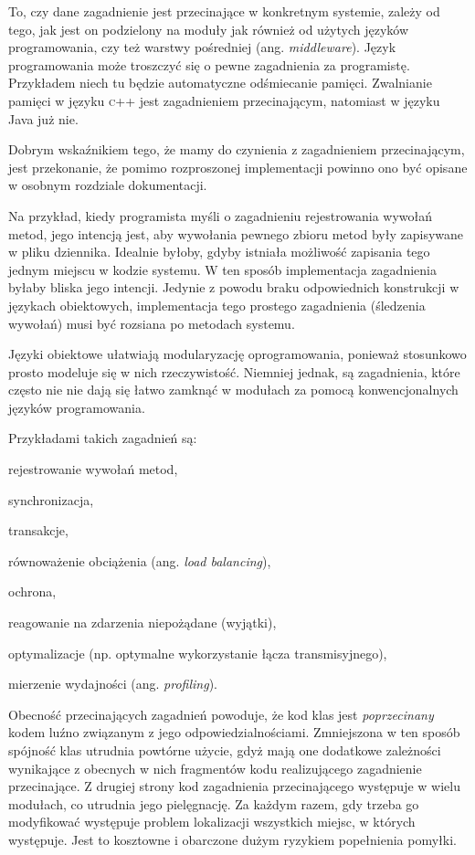 \documentclass[a4paper,12pt]{mwbk}
\begin{document}
To, czy dane zagadnienie jest przecinające w konkretnym systemie, zależy od tego,
jak jest on podzielony na moduły jak również od użytych języków programowania,
czy też warstwy pośredniej (ang. \emph{middleware}). Język programowania może
troszczyć się o pewne zagadnienia za programistę. Przykładem niech tu będzie
automatyczne odśmiecanie pamięci.  Zwalnianie pamięci w języku \textsc{c++}
jest zagadnieniem przecinającym, natomiast w języku Java już nie.

Dobrym wskaźnikiem tego, że mamy do czynienia z zagadnieniem przecinającym,
jest przekonanie, że pomimo rozproszonej implementacji powinno ono być opisane
w osobnym rozdziale dokumentacji. 

Na przykład, kiedy programista myśli o zagadnieniu rejestrowania wywołań metod,
jego intencją jest, aby wywołania pewnego zbioru metod były zapisywane w pliku
dziennika. Idealnie byłoby, gdyby istniała możliwość zapisania tego  jednym miejscu w
kodzie systemu. W ten sposób implementacja zagadnienia byłaby bliska jego
intencji.  Jedynie z powodu braku odpowiednich konstrukcji w językach
obiektowych, implementacja tego prostego zagadnienia (śledzenia wywołań) musi
być rozsiana po metodach systemu.

Języki obiektowe ułatwiają modularyzację oprogramowania, ponieważ stosunkowo prosto 
modeluje się w nich rzeczywistość. Niemniej jednak, są zagadnienia, które
często nie nie dają się łatwo zamknąć w modułach za pomocą konwencjonalnych
języków programowania. 

Przykładami takich zagadnień są: 
\begin{itemize*}
\item rejestrowanie wywołań metod,
\item synchronizacja,
\item transakcje,
\item równoważenie obciążenia (ang. \emph{load balancing}),
\item ochrona,
\item reagowanie na zdarzenia niepożądane (wyjątki),
\item optymalizacje (np. optymalne wykorzystanie łącza transmisyjnego),
\item mierzenie wydajności (ang. \emph{profiling}). 
\end{itemize*}
         
           
Obecność przecinających zagadnień powoduje, że kod klas jest {\it poprzecinany}
kodem luźno związanym z jego odpowiedzialnościami.  Zmniejszona w ten sposób
spójność klas utrudnia powtórne użycie, gdyż mają one dodatkowe zależności
wynikające z obecnych w nich fragmentów kodu realizującego zagadnienie
przecinające. Z drugiej strony kod zagadnienia przecinającego występuje w wielu
modułach, co utrudnia jego pielęgnację.  Za każdym razem, gdy trzeba go
modyfikować występuje problem lokalizacji wszystkich miejsc, w których
występuje. Jest to kosztowne i obarczone dużym ryzykiem popełnienia pomyłki.
\end{document}
